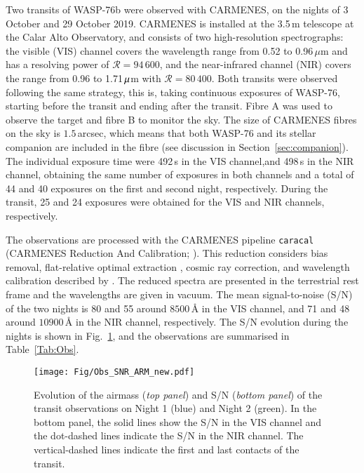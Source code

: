 \documentclass{aa}
\begin{document}
Two transits of WASP-76b were observed with CARMENES, on the nights of 3 October and 29 October 2019. CARMENES is installed at the 3.5\,m telescope at the Calar Alto Observatory, and consists of two high-resolution spectrographs: the visible (VIS) channel covers the wavelength range from 0.52 to 0.96\,${\mu}$m and has a resolving power of $\mathcal{R} = 94\,600$, and the near-infrared channel (NIR) covers the range from 0.96 to 1.71\,${\rm \mu}$m with $\mathcal{R} = 80\,400$. Both transits were observed following the same strategy, this is, taking continuous exposures of WASP-76, starting before the transit and ending after the transit. Fibre A was used to observe the target and fibre B to monitor the sky. The size of CARMENES fibres on the sky is $1.5$\,arcsec, which means that both WASP-76 and its stellar companion are included in the fibre (see discussion in Section~\ref{sec:companion}). 
The individual exposure time were 492\,s in the VIS channel,and 498\,s in the NIR channel, obtaining the same number of exposures in both channels and a total of 44 and 40 exposures on the first and second night, respectively. During the transit, 25 and 24 exposures were obtained for the VIS and NIR channels, respectively. 

The observations are processed with the CARMENES pipeline {\tt caracal} (CARMENES Reduction And Calibration; \citealt{CARACAL}). This reduction considers bias removal, flat-relative optimal extraction \citep{Zechmeister2014}, cosmic ray correction, and wavelength calibration described by \citet{carmcalibration}. The reduced spectra are presented in the terrestrial rest frame and the wavelengths are given in vacuum. The mean signal-to-noise (S/N) of the two nights is 80 and 55 around $8500$\,{\AA} in the VIS channel, and 71 and 48 around $10900$\,{\AA} in the NIR channel, respectively. The S/N evolution during the nights is shown in Fig.~\ref{fig:S/N}, and the observations are summarised in Table~\ref{Tab:Obs}. 

\begin{figure}[]
\centering
\texttt{[image: Fig/Obs\_SNR\_ARM\_new.pdf]}
\caption{Evolution of the airmass ({\it top panel}) and S/N ({\it bottom panel}) of the transit observations on Night 1 (blue) and Night 2 (green). In the bottom panel, the solid lines show the S/N in the VIS channel and the dot-dashed lines indicate the S/N in the NIR channel. The vertical-dashed lines indicate the first and last contacts of the transit.}
\label{fig:S/N}
\end{figure}
\end{document}
